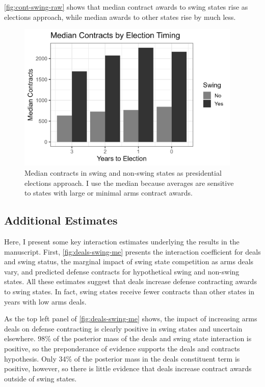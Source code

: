 \documentclass[12pt]{article}
\begin{document}
\autoref{fig:cont-swing-raw} shows that median contract awards to swing states rise as elections approach, while median awards to other states rise by much less. 

\begin{figure}[htpb]
	\centering
		\includegraphics[width=0.95\textwidth]{cont-swing-raw.png}
	\caption{Median contracts in swing and non-swing states as presidential elections approach. I use the median because averages are sensitive to states with large or minimal arms contract awards. }
	\label{fig:cont-swing-raw}
\end{figure}


\subsection{Additional Estimates}


Here, I present some key interaction estimates underlying the results in the manuscript. 
First, \autoref{fig:deals-swing-me} presents the interaction coefficient for deals and swing status, the marginal impact of swing state competition as arms deals vary, and predicted defense contracts for hypothetical swing and non-swing states. 
All these estimates suggest that deals increase defense contracting awards to swing states. 
In fact, swing states receive fewer contracts than other states in years with low arms deals. 


As the top left panel of \autoref{fig:deals-swing-me} shows, the impact of increasing arms deals on defense contracting is clearly positive in swing states and uncertain elsewhere.
98\% of the posterior mass of the deals and swing state interaction is positive, so the preponderance of evidence supports the deals and contracts hypothesis.
Only 34\% of the posterior mass in the deals constituent term is positive, however, so there is little evidence that deals increase contract awards outside of swing states. 
\end{document}
